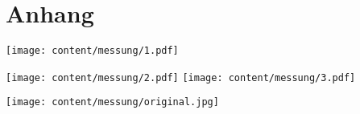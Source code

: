 \section*{Anhang}


\centering

\null
\vfill
\texttt{[image: content/messung/1.pdf]}
\vfill
\null

\newpage

\null
\vfill
\texttt{[image: content/messung/2.pdf]}
\vfill
\texttt{[image: content/messung/3.pdf]}
\vfill
\null

\newpage

\null
\vfill
\texttt{[image: content/messung/original.jpg]}
\vfill
\null

